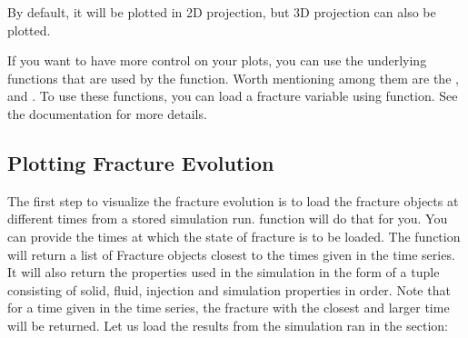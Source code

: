 \documentclass[letterpaper,10pt,english]{sphinxmanual}
\begin{document}
\sphinxAtStartPar
By default, it will be plotted in 2D projection, but 3D projection can also be plotted.


\sphinxAtStartPar
If you want to have more control on your plots, you can use the underlying functions that are used by the  function. Worth mentioning among them are the ,  and . To use these functions, you can load a fracture variable using  function. See the documentation for more details.


\subsection{Plotting Fracture Evolution}
\label{\detokenize{Visualization:plotting-fracture-evolution}}
\sphinxAtStartPar
The first step to visualize the fracture evolution is to load the fracture objects at different times from a stored simulation run.  function will do that for you. You can provide the times at which the state of fracture is to be loaded. The function will return a list of Fracture objects closest to the times given in the time series. It will also return the properties used in the simulation in the form of a tuple consisting of solid, fluid, injection and simulation properties in order. Note that for a time given in the time series, the fracture with the closest and larger time will be returned. Let us load the results from the simulation ran in the {\hyperref[\detokenize{RunningASimulation:run-a-simulation}]{}} section:

\begin{sphinxVerbatim}[commandchars=\\\{\}]
   

   
\end{sphinxVerbatim}
\end{document}
